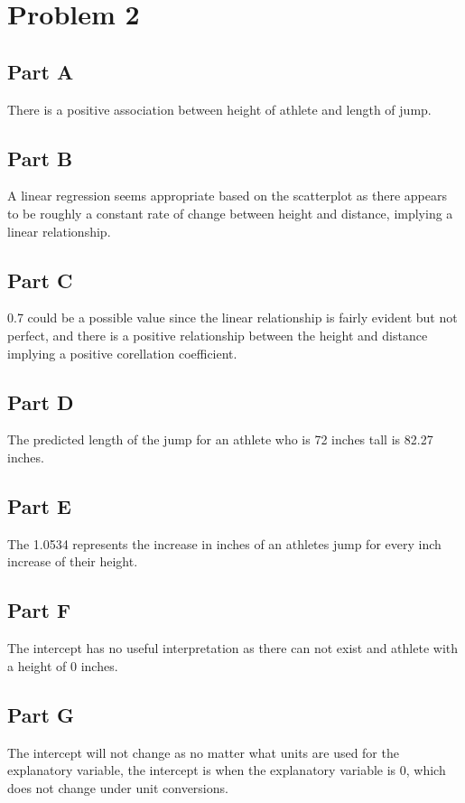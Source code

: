 \documentclass[12pt]{extarticle}
\begin{document}
\section*{Problem 2}
\subsection*{Part A}
There is a positive association between height of athlete and length of jump.

\subsection*{Part B}
A linear regression seems appropriate based on the scatterplot as there appears to be roughly a constant rate of change between height and distance, implying a linear relationship.

\subsection*{Part C}
0.7 could be a possible value since the linear relationship is fairly evident but not perfect, and there is a positive relationship between the height and distance implying a positive corellation coefficient.

\subsection*{Part D}
The predicted length of the jump for an athlete who is 72 inches tall is 82.27 inches.

\subsection*{Part E}
The 1.0534 represents the increase in inches of an athletes jump for every inch increase of their height.

\subsection*{Part F}
The intercept has no useful interpretation as there can not exist and athlete with a height of 0 inches.

\subsection*{Part G}
The intercept will not change as no matter what units are used for the explanatory variable, the intercept is when the explanatory variable is 0, which does not change under unit conversions.
\end{document}
